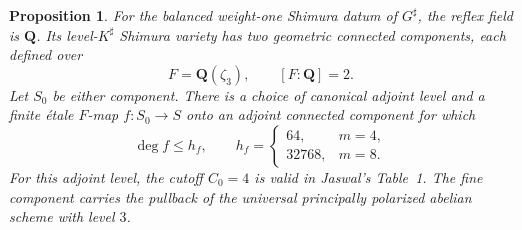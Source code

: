 \documentclass[11pt]{article}
\newtheorem{proposition}[theorem]{Proposition}
\theoremstyle{definition}
\theoremstyle{remark}
\begin{document}
\begin{proposition}\label{prop:ea-fine-normalization}
For the balanced weight-one Shimura datum of $G^\sharp$, the reflex
field is $\mathbf Q$.  Its level-$K^\sharp$ Shimura variety has two
geometric connected components, each defined over
\[
                         F=\mathbf Q(\zeta_3),\qquad [F:\mathbf Q]=2.
\]
Let $S_0$ be either component.  There is a choice of canonical adjoint
level and a finite \emph{\'etale} $F$-map $f:S_0\to S$ onto an adjoint
connected component for which
\begin{equation}\label{eq:ea-hf-values}
 \deg f\le h_f,\qquad
 h_f=\begin{cases}64,&m=4,\\32768,&m=8.\end{cases}
\end{equation}
For this adjoint level, the cutoff $C_0=4$ is valid in Jaswal's
Table~1.  The fine component carries the pullback of the universal
principally polarized abelian scheme with level $3$.
\end{proposition}
\end{document}
